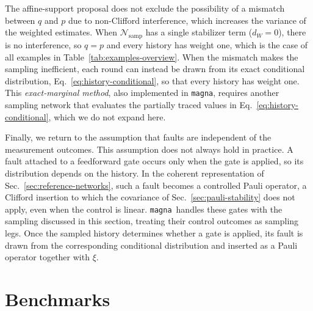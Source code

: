 \documentclass[aps,prx,twocolumn,superscriptaddress,longbibliography]{revtex4-2}
\newcommand{\simname}{\texttt{magna}}
\begin{document}
The affine-support proposal does not exclude the possibility of a mismatch between $q$ and $p$ due to non-Clifford interference, 
which increases the variance of the weighted estimates.
When $\mathcal N_{\text{samp}}$ has a single stabilizer term ($d_W=0$), there is no interference,
so $q=p$ and every history has weight one,
which is the case of all examples in Table~\ref{tab:examples-overview}.
When the mismatch makes the sampling inefficient,
each round can instead be drawn from its exact conditional distribution, Eq.~\eqref{eq:history-conditional},
so that every history has weight one.
This \emph{exact-marginal method}, also implemented in \simname,
requires another sampling network that evaluates the partially traced values in Eq.~\eqref{eq:history-conditional},
which we do not expand here.

Finally, we return to the assumption that faults are independent of the measurement outcomes.
This assumption does not always hold in practice.
A fault attached to a feedforward gate occurs only when the gate is applied,
so its distribution depends on the history.
In the coherent representation of Sec.~\ref{sec:reference-networks}, such a fault becomes a controlled Pauli operator,
a Clifford insertion to which the covariance of Sec.~\ref{sec:pauli-stability} does not apply,
even when the control is linear.
\simname\ handles these gates with the sampling discussed in this section,
treating their control outcomes as sampling legs.
Once the sampled history determines whether a gate is applied,
its fault is drawn from the corresponding conditional distribution and inserted as a Pauli operator together with $\xi$.


\section{Benchmarks}\label{sec:examples}


\end{document}
